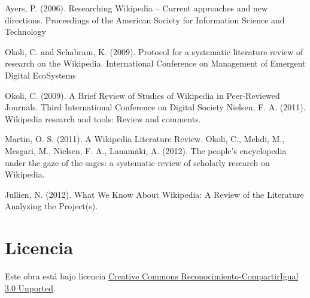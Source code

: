 \documentclass[twoside]{article}
\begin{document}
\begin{multicols}{2}
Ayers, P. (2006). Researching Wikipedia -- Current approaches and new directions. Proceedings of the American Society for Information Science and Technology

Okoli, C. and Schabram, K. (2009). Protocol for a systematic literature review of research on the Wikipedia. International Conference on Management of Emergent Digital EcoSystems

Okoli, C. (2009). A Brief Review of Studies of Wikipedia in Peer-Reviewed Journals. Third International Conference on Digital Society
Nielsen, F. A. (2011). Wikipedia research and tools: Review and comments.

Martin, O. S. (2011). A Wikipedia Literature Review.
Okoli, C., Mehdi, M., Mesgari, M., Nielsen, F. A.,  Lanam\"{a}ki, A. (2012). The people's encyclopedia under the gaze of the sages: a systematic review of scholarly research on Wikipedia.

Jullien, N. (2012). What We Know About Wikipedia: A Review of the Literature Analyzing the Project(s).

\section{Licencia}
Este obra est\'{a} bajo licencia \href{http://creativecommons.org/licenses/by-sa/3.0/}{Creative Commons Reconocimiento-CompartirIgual 3.0 Unported}.

\end{multicols}
\end{document}
